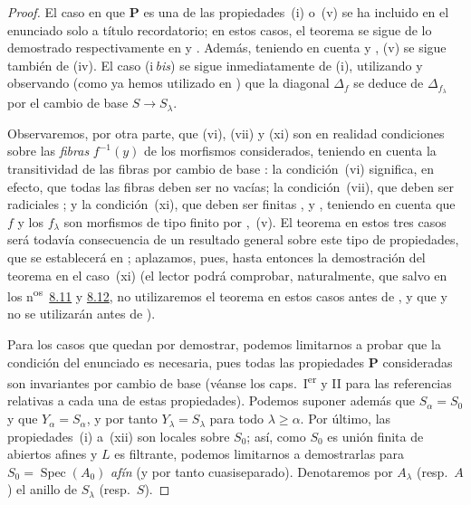 \begin{proof}
El caso en que $\mathbf{P}$ es una de las propiedades~(i) o~(v) se ha incluido en el enunciado solo a título recordatorio; en estos casos, el teorema se sigue de lo demostrado respectivamente en  y .
Además, teniendo en cuenta  y , (v) se sigue también de (iv).
El caso (i\,\emph{bis}) se sigue inmediatamente de (i), utilizando  y observando (como ya hemos utilizado en ) que la diagonal $\Delta_f$ se deduce de $\Delta_{f_\lambda}$ por el cambio de base $S\to S_\lambda$.

Observaremos, por otra parte, que (vi), (vii) y (xi) son en realidad condiciones sobre las \emph{fibras} $f^{-1}(y)$ de los morfismos considerados, teniendo en cuenta la transitividad de las fibras por cambio de base : la condición~(vi) significa, en efecto, que todas las fibras deben ser no vacías; la condición~(vii), que deben ser radiciales ; y la condición~(xi), que deben ser finitas ,  y , teniendo en cuenta que $f$ y los $f_\lambda$ son morfismos de tipo finito por ,~(v).
El teorema en estos tres casos será todavía consecuencia de un resultado general sobre este tipo de propiedades, que se establecerá en ; aplazamos, pues, hasta entonces la demostración del teorema en el caso~(xi) (el lector podrá comprobar, naturalmente, que salvo en los n\textsuperscript{os}~{\hyperlink{ega4.c04.subsec.8-11}{8.11}} y {\hyperlink{ega4.c04.subsec.8-12}{8.12}}, no utilizaremos el teorema en estos casos antes de , y que  y  no se utilizarán antes de ).

Para los casos que quedan por demostrar, podemos limitarnos a probar que la condición del enunciado es necesaria, pues todas las propiedades $\mathbf{P}$ consideradas son invariantes por cambio de base (véanse los caps.~I\textsuperscript{er} y II para las referencias relativas a cada una de estas propiedades).
Podemos suponer además que $S_\alpha=S_0$ y que $Y_\alpha=S_\alpha$, y por tanto $Y_\lambda=S_\lambda$ para todo $\lambda\geqslant\alpha$.
Por último, las propiedades~(i) a~(xii) son locales sobre $S_0$; así, como $S_0$ es unión finita de abiertos afines y $L$ es filtrante, podemos limitarnos a demostrarlas para $S_0=\operatorname{Spec}(A_0)$ \emph{afín} (y por tanto cuasiseparado).
Denotaremos por $A_\lambda$ (resp.\ $A$) el anillo de $S_\lambda$ (resp.\ $S$).


\end{proof}
